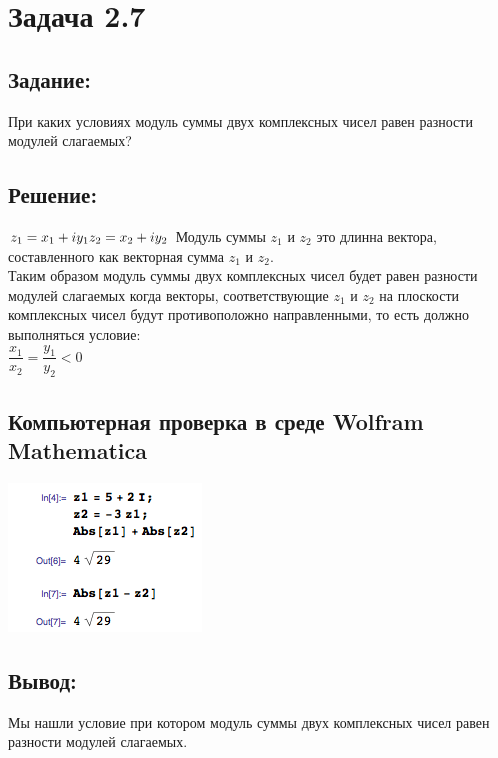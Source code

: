 \section{Задача 2.7}
\subsection{Задание:}
При каких условиях модуль суммы двух комплексных чисел равен разности модулей слагаемых?
\subsection{Решение:}
$
	z_1 = x_1 + i y_1\\
	z_2 = x_2 + i y_2\\
$
Модуль суммы $ z_1 $ и $ z_2 $ это длинна вектора, составленного как векторная сумма $ z_1 $ и $ z_2 $.\\
Таким образом модуль суммы двух комплексных чисел будет равен разности модулей слагаемых когда векторы,
соответствующие $ z_1 $ и $ z_2 $ на плоскости комплексных чисел будут противоположно направленными, то есть
должно выполняться условие:
\\[1em]
$
	\dfrac{x_1}{x_2} = \dfrac{y_1}{y_2} < 0
$
\subsection{Компьютерная проверка в среде Wolfram Mathematica}
\includegraphics[scale=0.6]{task/2_07/screen1.png}
\subsection{Вывод:}
Мы нашли условие при котором модуль суммы двух комплексных чисел равен разности модулей слагаемых.
